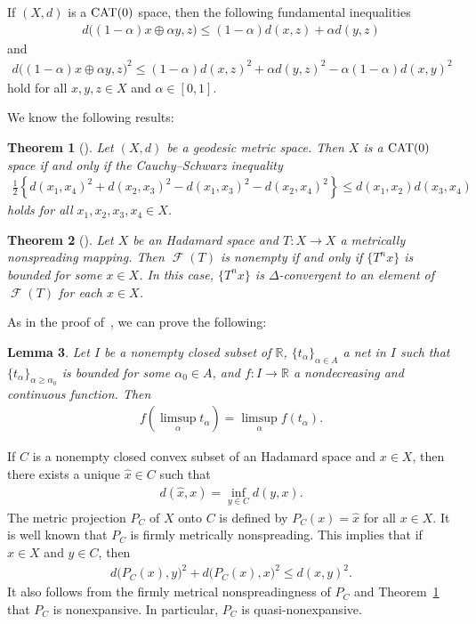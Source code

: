 \documentclass[draft]{amsart}
\numberwithin{equation}{section}
\def\R{\mathbb R}
\DeclareMathOperator{\Fix}{\mathcal{F}}
\newcommand{\CAT}{\textup{CAT}}
\theoremstyle{plain}
\newtheorem{theorem}{Theorem}[section]
\newtheorem{lemma}[theorem]{Lemma}
\theoremstyle{definition}
\theoremstyle{remark}
\begin{document}
If $(X,d)$ is a $\CAT(0)$ space, then 
the following fundamental inequalities 
\begin{align}\label{eq:convexity-d}
 d\bigl((1-\alpha)x\oplus \alpha y, z\bigr) 
 \leq (1-\alpha)d(x,z) + \alpha d(y,z)
\end{align}
and 
\begin{align}\label{eq:CN-inequality}
 d\bigl((1-\alpha)x\oplus \alpha y, z\bigr)^2
 \leq (1-\alpha)d(x,z)^2 + \alpha d(y,z)^2 -\alpha(1-\alpha)d(x,y)^2
\end{align}
hold for all $x,y,z\in X$ and $\alpha\in [0,1]$. 

We know the following results: 

\begin{theorem}[{\cite[Theorem~1.3.3]{MR3241330}}]\label{thm:CS-inequality}
Let $(X,d)$ be a geodesic metric space. 
Then $X$ is a $\CAT(0)$ space if and only if the Cauchy--Schwarz inequality
\begin{align}
  \frac{1}{2}
 \left\{d(x_1,x_4)^2+d(x_2,x_3)^2-d(x_1,x_3)^2-d(x_2,x_4)^2\right\}
 \leq d(x_1,x_2)d(x_3,x_4)
\end{align}
holds for all $x_1,x_2,x_3,x_4\in X$. 
\end{theorem}

\begin{theorem}[\cite{MR4021035}]\label{thm:metrically-nonspareding}
 Let $X$ be an Hadamard space and $T\colon X\to X$ a metrically nonspreading mapping. 
 Then $\Fix(T)$ is nonempty if and only if $\{T^nx\}$ is bounded for some $x\in X$. 
 In this case, $\{T^nx\}$ is $\Delta$-convergent to an element of $\Fix(T)$ 
 for each $x\in X$. 
\end{theorem}

As in the proof of~\cite[Lemma~2.5]{MR3777000}, we can prove the following: 

\begin{lemma}\label{lem:f-net}
 Let $I$ be a nonempty closed subset of $\R$, 
 $\{t_{\alpha}\}_{\alpha \in A}$ a net in $I$ such that 
 $\{t_{\alpha}\}_{\alpha\geq \alpha_0}$ is bounded 
 for some $\alpha_0\in A$, and 
 $f\colon I\to \R$ a nondecreasing and continuous function. 
 Then 
 \begin{align*}
  f\left(\limsup_{\alpha}t_{\alpha}\right) 
  = \limsup_{\alpha} f(t_{\alpha}). 
 \end{align*}
\end{lemma}

If $C$ is a nonempty closed convex subset of an Hadamard space 
and $x\in X$, then there exists a unique $\hat{x}\in C$ such that 
\begin{align}
 d(\hat{x}, x) = \inf_{y\in C} d(y,x). 
\end{align}
The metric projection $P_C$ of $X$ onto $C$ is defined by 
$P_C(x)=\hat{x}$ for all $x\in X$. 
It is well known that $P_C$ is firmly metrically nonspreading. 
This implies that if $x\in X$ and $y\in C$, then 
\begin{align}
 d\bigl(P_C(x), y\bigr)^2 + d\bigl(P_C(x),x\bigr)^2 
 \leq d(x, y)^2. 
\end{align}
It also follows from the firmly metrical nonspreadingness of $P_C$ 
and Theorem~\ref{thm:CS-inequality} that 
$P_C$ is nonexpansive. 
In particular, $P_C$ is quasi-nonexpansive. 
\end{document}
